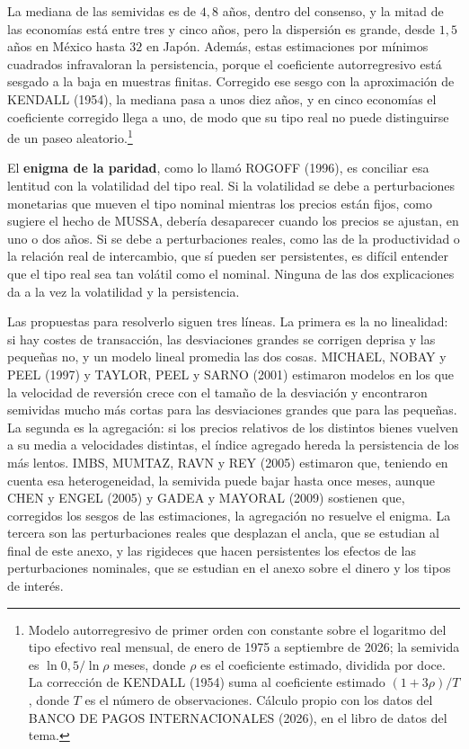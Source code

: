 \documentclass[10pt,a4paper]{article}
\newcounter{anexo}
\begin{document}
La mediana de las semividas es de $4{,}8$ años, dentro del consenso, y la mitad de las economías está entre tres y cinco años, pero la dispersión es grande, desde $1{,}5$ años en México hasta $32$ en Japón. Además, estas estimaciones por mínimos cuadrados infravaloran la persistencia, porque el coeficiente autorregresivo está sesgado a la baja en muestras finitas. Corregido ese sesgo con la aproximación de KENDALL (1954), la mediana pasa a unos diez años, y en cinco economías el coeficiente corregido llega a uno, de modo que su tipo real no puede distinguirse de un paseo aleatorio.\footnote{%
    Modelo autorregresivo de primer orden con constante sobre el logaritmo del tipo efectivo real mensual, de enero de 1975 a septiembre de 2026; la semivida es $\ln 0{,}5/\ln\rho$ meses, donde $\rho$ es el coeficiente estimado, dividida por doce. La corrección de KENDALL (1954) suma al coeficiente estimado $(1+3\rho)/T$, donde $T$ es el número de observaciones. Cálculo propio con los datos del BANCO DE PAGOS INTERNACIONALES (2026), en el libro de datos del tema.
}

El \textbf{enigma de la paridad}, como lo llamó ROGOFF (1996), es conciliar esa lentitud con la volatilidad del tipo real. Si la volatilidad se debe a perturbaciones monetarias que mueven el tipo nominal mientras los precios están fijos, como sugiere el hecho de MUSSA, debería desaparecer cuando los precios se ajustan, en uno o dos años. Si se debe a perturbaciones reales, como las de la productividad o la relación real de intercambio, que sí pueden ser persistentes, es difícil entender que el tipo real sea tan volátil como el nominal. Ninguna de las dos explicaciones da a la vez la volatilidad y la persistencia.

Las propuestas para resolverlo siguen tres líneas. La primera es la no linealidad: si hay costes de transacción, las desviaciones grandes se corrigen deprisa y las pequeñas no, y un modelo lineal promedia las dos cosas. MICHAEL, NOBAY y PEEL (1997) y TAYLOR, PEEL y SARNO (2001) estimaron modelos en los que la velocidad de reversión crece con el tamaño de la desviación y encontraron semividas mucho más cortas para las desviaciones grandes que para las pequeñas. La segunda es la agregación: si los precios relativos de los distintos bienes vuelven a su media a velocidades distintas, el índice agregado hereda la persistencia de los más lentos. IMBS, MUMTAZ, RAVN y REY (2005) estimaron que, teniendo en cuenta esa heterogeneidad, la semivida puede bajar hasta once meses, aunque CHEN y ENGEL (2005) y GADEA y MAYORAL (2009) sostienen que, corregidos los sesgos de las estimaciones, la agregación no resuelve el enigma. La tercera son las perturbaciones reales que desplazan el ancla, que se estudian al final de este anexo, y las rigideces que hacen persistentes los efectos de las perturbaciones nominales, que se estudian en el anexo sobre el dinero y los tipos de interés.
\end{document}
